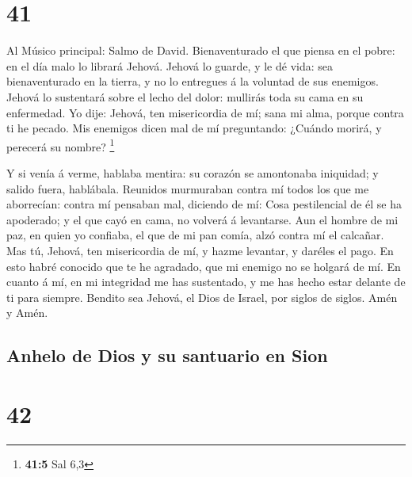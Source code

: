 \hypertarget{section-40}{%
\section{41}\label{section-40}}

 Al Músico principal: Salmo de David. Bienaventurado el que
piensa en el pobre: en el día malo lo librará Jehová. 
Jehová lo guarde, y le dé vida: sea bienaventurado en la tierra, y no lo
entregues á la voluntad de sus enemigos.  Jehová lo
sustentará sobre el lecho del dolor: mullirás toda su cama en su
enfermedad.  Yo dije: Jehová, ten misericordia de mí; sana
mi alma, porque contra ti he pecado.  Mis enemigos dicen mal
de mí preguntando: ¿Cuándo morirá, y perecerá su nombre? \footnote{\textbf{41:5}
  Sal 6,3}

 Y si venía á verme, hablaba mentira: su corazón se
amontonaba iniquidad; y salido fuera, hablábala.  Reunidos
murmuraban contra mí todos los que me aborrecían: contra mí pensaban
mal, diciendo de mí:  Cosa pestilencial de él se ha
apoderado; y el que cayó en cama, no volverá á levantarse. 
Aun el hombre de mi paz, en quien yo confiaba, el que de mi pan comía,
alzó contra mí el calcañar.  Mas tú, Jehová, ten
misericordia de mí, y hazme levantar, y daréles el pago. 
En esto habré conocido que te he agradado, que mi enemigo no se holgará
de mí.  En cuanto á mí, en mi integridad me has sustentado,
y me has hecho estar delante de ti para siempre.  Bendito
sea Jehová, el Dios de Israel, por siglos de siglos. Amén y Amén.

\hypertarget{anhelo-de-dios-y-su-santuario-en-sion}{%
\subsection{Anhelo de Dios y su santuario en
Sion}\label{anhelo-de-dios-y-su-santuario-en-sion}}

\hypertarget{section-41}{%
\section{42}\label{section-41}}

